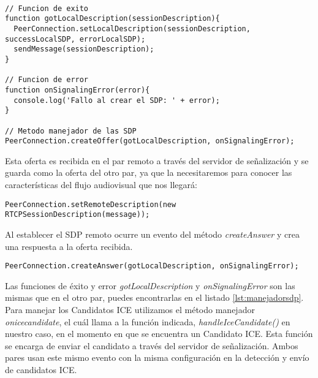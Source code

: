 \begin{lstlisting}[caption={Manejador de los SDP.}, label={lst:manejadorsdp}]

// Funcion de exito
function gotLocalDescription(sessionDescription){
  PeerConnection.setLocalDescription(sessionDescription, successLocalSDP, errorLocalSDP);
  sendMessage(sessionDescription);
}

// Funcion de error
function onSignalingError(error){
  console.log('Fallo al crear el SDP: ' + error);	
}

// Metodo manejador de las SDP
PeerConnection.createOffer(gotLocalDescription, onSignalingError);

\end{lstlisting}

Esta oferta es recibida en el par remoto a través del servidor de señalización y se guarda como la oferta del otro par, ya que la necesitaremos para conocer las características del flujo audiovisual que nos llegará:\\


\begin{lstlisting}[caption={Estableciendo SDP del par remoto.}]
PeerConnection.setRemoteDescription(new RTCPSessionDescription(message));
\end{lstlisting}

Al establecer el SDP remoto ocurre un evento del método \emph{createAnswer} y crea una respuesta a la oferta recibida.\\

\begin{lstlisting}[caption=Manejador de respuestas SDP]
PeerConnection.createAnswer(gotLocalDescription, onSignalingError);
\end{lstlisting}


Las funciones de éxito y error \emph{gotLocalDescription} y \emph{onSignalingError} son las mismas que en el otro par, puedes encontrarlas en el listado \ref{lst:manejadorsdp}.\\

Para manejar los Candidatos ICE utilizamos el método manejador \emph{onicecandidate}, el cuál llama a la función indicada, \emph{handleIceCandidate()} en nuestro caso, en el momento en que se encuentra un Candidato ICE. Esta función se encarga de enviar el candidato a través del servidor de señalización. Ambos pares usan este mismo evento con la misma configuración en la detección y envío de candidatos ICE.\\

